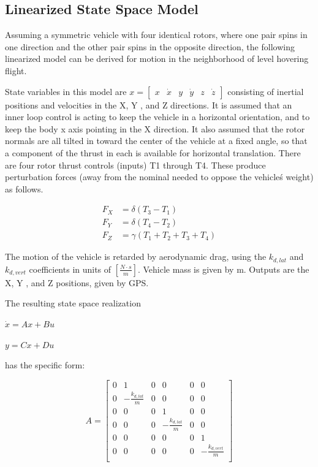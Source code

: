 \documentclass{article}
\begin{document}
\subsection*{Linearized State Space Model}

Assuming a symmetric vehicle with four identical rotors, where one pair spins in one direction and
the other pair spins in the opposite direction, the following linearized model can be derived for
motion in the neighborhood of level hovering flight.

State variables in this model are
$x = \begin{bmatrix} x & \dot{x} & y & \dot{y} & z & \dot{z} \end{bmatrix}$
consisting of inertial positions and velocities in the X, Y , and Z directions. It is assumed that an
inner loop control is acting to keep the vehicle in a horizontal orientation, and to keep the body
x axis pointing in the X direction. It also assumed that the rotor normals are all tilted in toward
the center of the vehicle at a fixed angle, so that a component of the thrust in each is available for
horizontal translation. There are four rotor thrust controls (inputs) T1 through T4. These produce
perturbation forces (away from the nominal needed to oppose the vehicle\'s weight) as follows.

\begin{align*}
    F_X &= \delta(T_3 - T_1) \\
    F_Y &= \delta(T_4 - T_2) \\
    F_Z &= \gamma(T_1 + T_2 + T_3 + T_4)
\end{align*}
     
The motion of the vehicle is retarded by aerodynamic drag, using the $k_{d,lat}$ and $k_{d,vert}$ coefficients
in units of $[ \frac{N \cdot s}{m} ]$. Vehicle mass is given by m. Outputs are the X, Y , and Z positions, given by
GPS.

The resulting state space realization

$\dot{x} = Ax + Bu$

$y = Cx + Du$

has the specific form:

\[
A = 
\begin{bmatrix}
0 & 1 & 0 & 0 & 0 & 0 \\
0 & -\frac{k_{d,lat}}{m} & 0 & 0 & 0 & 0 \\
0 & 0 & 0 & 1 & 0 & 0 \\
0 & 0 & 0 & -\frac{k_{d,lat}}{m} & 0 & 0 \\
0 & 0 & 0 & 0 & 0 & 1 \\
0 & 0 & 0 & 0 & 0 & -\frac{k_{d,vert}}{m} \\
\end{bmatrix}
\]
\end{document}
